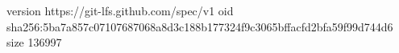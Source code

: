 version https://git-lfs.github.com/spec/v1
oid sha256:5ba7a857c07107687068a8d3c188b177324f9c3065bffacfd2bfa59f99d744d6
size 136997
